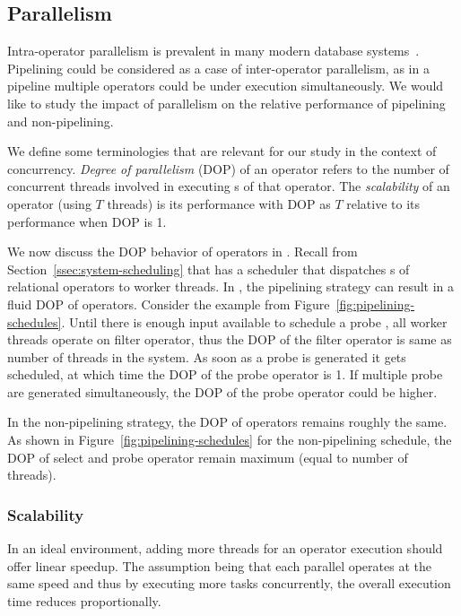 \subsection{Parallelism}
Intra-operator parallelism is prevalent in many modern database systems~\cite{monetdb, morsel, quickstep-system, vectorwise}.
Pipelining could be considered as a case of inter-operator parallelism, as in a pipeline multiple operators could be under execution simultaneously. 
We would like to study the impact of parallelism on the relative performance of pipelining and non-pipelining.

We define some terminologies that are relevant for our study in the context of concurrency.
\textit{Degree of parallelism} (DOP) of an operator refers to the number of concurrent threads involved in executing \wo{}s of that operator. 
The \textit{scalability} of an operator (using $T$ threads) is its performance with DOP as $T$ relative to its performance when DOP is 1.

We now discuss the DOP behavior of operators in \sys{}.
Recall from Section~\ref{ssec:system-scheduling} that \sys{} has a scheduler that dispatches \wo{}s  of relational operators to worker threads.
In \sys{}, the pipelining strategy can result in a fluid DOP of operators.
Consider the example from Figure~\ref{fig:pipelining-schedules}.
Until there is enough input available to schedule a probe \wo{}, all worker threads operate on filter operator, thus the DOP of the filter operator is same as number of threads in the system.
As soon as a probe \wo{} is generated it gets scheduled, at which time the DOP of the probe operator is 1.
If multiple probe \wo{} are generated simultaneously, the DOP of the probe operator could be higher.

In the non-pipelining strategy, the DOP of operators remains roughly the same.
As shown in Figure~\ref{fig:pipelining-schedules} for the non-pipelining schedule, the DOP of select and probe operator remain maximum (equal to number of threads).  

\subsubsection{Scalability}\label{sssec:scalability}
In an ideal environment, adding more threads for an operator execution should offer linear speedup.
The assumption being that each parallel \wo{} operates at the same speed and thus by executing more tasks concurrently, the overall execution time reduces proportionally. 

